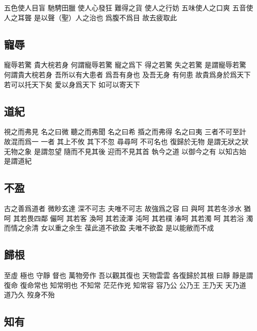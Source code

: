 \documentclass[a5paper,zihao=-4,oneside,UTF8]{ctexart}
\begin{document}
五色使人目盲 馳騁田臘 使人心發狂 難得之貨 使人之行妨 五味使人之口爽 五音使人之耳聾 
是以聲（聖）人之治也 爲腹不爲目 故去疲取此 



\subsection{寵辱}



寵辱若驚 貴大梡若身 
何謂寵辱若驚 寵之爲下 得之若驚 失之若驚 是謂寵辱若驚 
何謂貴大梡若身 吾所以有大患者 爲吾有身也 及吾无身 有何患 
故貴爲身於爲天下 若可以托天下矣 愛以身爲天下 如可以寄天下 



\subsection{道紀}



視之而弗見 名之曰微 聽之而弗聞 名之曰希 捪之而弗得 名之曰夷 三者不可至計 故混而爲一 
一者 其上不攸 其下不忽 尋尋呵 不可名也 復歸於无物 
是謂无狀之狀 无物之象 是謂忽望 隨而不見其後 迎而不見其首 
執今之道 以御今之有 以知古始 是謂道紀 



\subsection{不盈}



古之善爲道者 微眇玄達 深不可志 夫唯不可志 故強爲之容 曰 
與呵 其若冬涉水 猶呵 其若畏四鄰 儼呵 其若客 渙呵 其若淩澤 沌呵 其若樸 湷呵 其若濁 呵 其若浴 
濁而情之余清 女以重之余生 
葆此道不欲盈 夫唯不欲盈 是以能敝而不成 



\subsection{歸根}



至虛 極也 守靜 督也 萬物旁作 吾以觀其復也 天物雲雲 各復歸於其根 
曰靜 靜是謂復命 復命常也 知常明也 不知常 茫茫作兇 知常容 容乃公 
公乃王 王乃天 天乃道 道乃久 歿身不殆




\subsection{知有}
\end{document}
